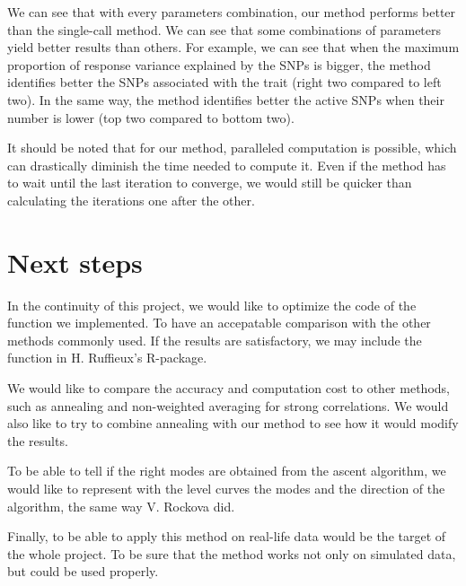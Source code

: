 \documentclass{article}
\numberwithin{equation}{section}
\begin{document}
We can see that with every parameters combination, our method performs better than the single-call method. We can see that some combinations of parameters yield better results than others. For example, we can see that when the maximum proportion of response variance explained by the SNPs is bigger, the method identifies better the SNPs associated with the trait (right two compared to left two). In the same way, the method identifies better the active SNPs when their number is lower (top two compared to bottom two).


It should be noted that for our method, paralleled computation is possible, which can drastically diminish the time needed to compute it. Even if the method has to wait until the last iteration to converge, we would still be quicker than calculating the iterations one after the other.
\newpage
\section{Next steps}
In the continuity of this project, we would like to optimize the code of the function we implemented. To have an accepatable comparison with the other methods commonly used. If the results are satisfactory, we may include the function in H. Ruffieux's R-package.

We would like to compare the accuracy and computation cost to other methods, such as annealing and non-weighted averaging for strong correlations. We would also like to try to combine annealing with our method to see how it would modify the results.

To be able to tell if the right modes are obtained from the ascent algorithm, we would like to represent with the level curves the modes and the direction of the algorithm, the same way V. Rockova \cite{rockova} did.

Finally, to be able to apply this method on real-life data would be the target of the whole project. To be sure that the method works not only on simulated data, but could be used properly.
\newpage


\end{document}
